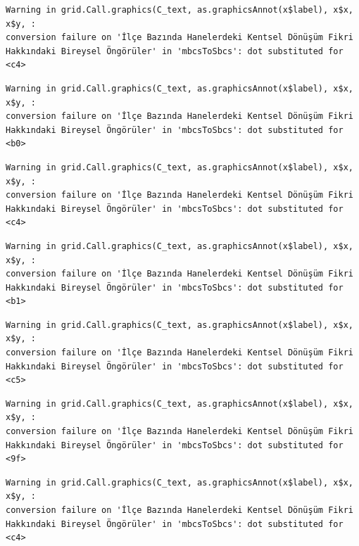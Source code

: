 \documentclass[
  11pt,
  a4paper,
  DIV=11,
  numbers=noendperiod]{scrartcl}
\begin{document}
\begin{verbatim}
Warning in grid.Call.graphics(C_text, as.graphicsAnnot(x$label), x$x, x$y, :
conversion failure on 'İlçe Bazında Hanelerdeki Kentsel Dönüşüm Fikri
Hakkındaki Bireysel Öngörüler' in 'mbcsToSbcs': dot substituted for <c4>
\end{verbatim}

\begin{verbatim}
Warning in grid.Call.graphics(C_text, as.graphicsAnnot(x$label), x$x, x$y, :
conversion failure on 'İlçe Bazında Hanelerdeki Kentsel Dönüşüm Fikri
Hakkındaki Bireysel Öngörüler' in 'mbcsToSbcs': dot substituted for <b0>
\end{verbatim}

\begin{verbatim}
Warning in grid.Call.graphics(C_text, as.graphicsAnnot(x$label), x$x, x$y, :
conversion failure on 'İlçe Bazında Hanelerdeki Kentsel Dönüşüm Fikri
Hakkındaki Bireysel Öngörüler' in 'mbcsToSbcs': dot substituted for <c4>
\end{verbatim}

\begin{verbatim}
Warning in grid.Call.graphics(C_text, as.graphicsAnnot(x$label), x$x, x$y, :
conversion failure on 'İlçe Bazında Hanelerdeki Kentsel Dönüşüm Fikri
Hakkındaki Bireysel Öngörüler' in 'mbcsToSbcs': dot substituted for <b1>
\end{verbatim}

\begin{verbatim}
Warning in grid.Call.graphics(C_text, as.graphicsAnnot(x$label), x$x, x$y, :
conversion failure on 'İlçe Bazında Hanelerdeki Kentsel Dönüşüm Fikri
Hakkındaki Bireysel Öngörüler' in 'mbcsToSbcs': dot substituted for <c5>
\end{verbatim}

\begin{verbatim}
Warning in grid.Call.graphics(C_text, as.graphicsAnnot(x$label), x$x, x$y, :
conversion failure on 'İlçe Bazında Hanelerdeki Kentsel Dönüşüm Fikri
Hakkındaki Bireysel Öngörüler' in 'mbcsToSbcs': dot substituted for <9f>
\end{verbatim}

\begin{verbatim}
Warning in grid.Call.graphics(C_text, as.graphicsAnnot(x$label), x$x, x$y, :
conversion failure on 'İlçe Bazında Hanelerdeki Kentsel Dönüşüm Fikri
Hakkındaki Bireysel Öngörüler' in 'mbcsToSbcs': dot substituted for <c4>
\end{verbatim}
\end{document}
